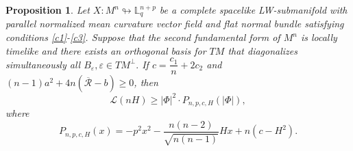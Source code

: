 \documentclass[10pt,a4paper]{amsart}
\newtheorem{proposition}{Proposition}
\begin{document}
\begin{proposition}
Let $X:M^n\looparrowright \mathbb{L}^{n+p}_{q}$ be a complete spacelike LW-submanifold with parallel normalized mean curvature vector field and flat normal bundle satisfying conditions \eqref{c1}-\eqref{c3}. Suppose that the second fundamental form of $M^n$ is locally timelike and there exists an orthogonal basis for $TM$ that diagonalizes simultaneously all $B_{\varepsilon},
\varepsilon\in TM^{\perp}.$ If $c=\dfrac{c_1}{n}+2c_2$ and
$(n-1)a^2+4n(\overline{\mathcal{R}}-b)\geq 0$,
then
\begin{equation}\label{hip_1_prop}
\mathcal{L}(nH)\geq |\Phi|^2\cdot P_{n,p,c,H}(|\Phi|),
\end{equation}
where 
\begin{equation}\label{hip_2_prop}
P_{n,p,c,H}(x)=-p^2x^2-\dfrac{n(n-2)}{\sqrt{n(n-1)}}Hx+n(c-H^2).
\end{equation}
\end{proposition}
\end{document}
